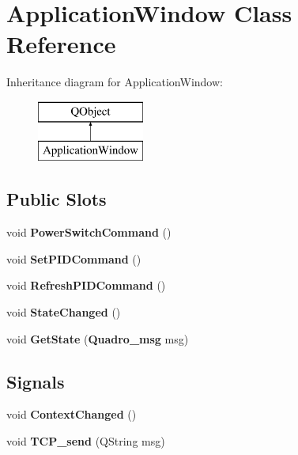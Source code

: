 \section{Application\-Window Class Reference}
\label{class_application_window}
Inheritance diagram for Application\-Window\-:\begin{figure}[H]
\begin{center}
\leavevmode
\includegraphics[height=2.000000cm]{class_application_window}
\end{center}
\end{figure}
\subsection*{Public Slots}
\begin{DoxyCompactItemize}
\item 
void {\bfseries Power\-Switch\-Command} ()\label{class_application_window_abc35b58c8ca2c39bd7a298103adfece1}

\item 
void {\bfseries Set\-P\-I\-D\-Command} ()\label{class_application_window_a4a0e87dea2ff1924c5dbcbeac592a214}

\item 
void {\bfseries Refresh\-P\-I\-D\-Command} ()\label{class_application_window_af900f0e296766b3691543f6d4883e9c7}

\item 
void {\bfseries State\-Changed} ()\label{class_application_window_a810fbc32edfda877bf65dc2c48c9f5a4}

\item 
void {\bfseries Get\-State} ({\bf Quadro\-\_\-msg} msg)\label{class_application_window_a9c777b3c7287e46df9d7983cc941b2ea}

\end{DoxyCompactItemize}
\subsection*{Signals}
\begin{DoxyCompactItemize}
\item 
void {\bfseries Context\-Changed} ()\label{class_application_window_a68c39d9258449139a831f5a9349648ad}

\item 
void {\bfseries T\-C\-P\-\_\-send} (Q\-String msg)\label{class_application_window_a7ebea099dd91d7ba1b5d207dfdd8c0fb}

\end{DoxyCompactItemize}
